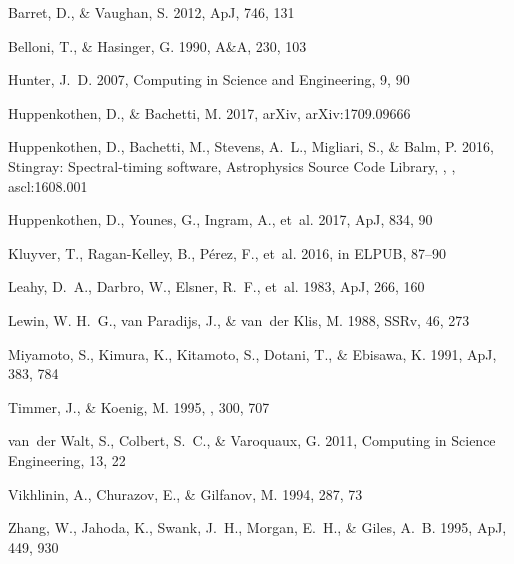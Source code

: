 \documentclass[twocolumn]{aastex61}
\begin{document}
\begin{thebibliography}{}
Barret, D., \& Vaughan, S. 2012, ApJ, 746, 131

Belloni, T., \& Hasinger, G. 1990, A{\&}A, 230, 103

Hunter, J.~D. 2007, Computing in Science and Engineering, 9, 90

Huppenkothen, D., \& Bachetti, M. 2017, arXiv, arXiv:1709.09666

{Huppenkothen}, D., {Bachetti}, M., {Stevens}, A.~L., {Migliari}, S., \&
  {Balm}, P. 2016, {Stingray: Spectral-timing software}, Astrophysics Source
  Code Library, , , ascl:1608.001

Huppenkothen, D., Younes, G., Ingram, A., {et~al.} 2017, ApJ, 834, 90

Kluyver, T., Ragan-Kelley, B., P{\'e}rez, F., {et~al.} 2016, in ELPUB, 87--90

Leahy, D.~A., Darbro, W., Elsner, R.~F., {et~al.} 1983, ApJ, 266, 160

Lewin, W. H.~G., van Paradijs, J., \& van~der Klis, M. 1988, SSRv, 46, 273

Miyamoto, S., Kimura, K., Kitamoto, S., Dotani, T., \& Ebisawa, K. 1991, ApJ,
  383, 784

{Timmer}, J., \& {Koenig}, M. 1995, \aap, 300, 707

van~der Walt, S., Colbert, S.~C., \& Varoquaux, G. 2011, Computing in Science
  Engineering, 13, 22

Vikhlinin, A., Churazov, E., \& Gilfanov, M. 1994, 287, 73

Zhang, W., Jahoda, K., Swank, J.~H., Morgan, E.~H., \& Giles, A.~B. 1995, ApJ,
  449, 930

\end{thebibliography}
\end{document}
